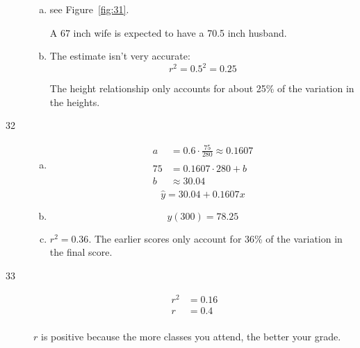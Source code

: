 \documentclass[letterpaper, landscape]{exam}
\begin{document}
\begin{description}
\begin{enumerate}[(a)]
          \item see Figure~\ref{fig:31}.  
          
          A 67 inch wife is expected to have a 70.5 inch husband.

          \item The estimate isn't very accurate:
            \[
              r^2 = 0.5^2 = 0.25
            \]

            The height relationship only accounts for about 25\% of the variation
            in the heights.
            
        \end{enumerate}

      \item[32]
        \begin{enumerate}[(a)]
          \item
            \begin{align*}
              a & = 0.6 \cdot \frac{75}{280} \approx 0.1607 \\
              \\
              75 & = 0.1607 \cdot 280 + b \\
              b  & \approx 30.04 \\
            \end{align*}
            \[
              \boxed{ \hat{y} = 30.04 + 0.1607 x }
            \]

          \item 
            \[
              y(300) = \boxed{ 78.25 }
            \]

          \item
            $r^2 = 0.36$.  The earlier scores only account for 36\% of the
            variation in the final score. 
        \end{enumerate}

      \item[33]
        \begin{align*}
          r^2 & = 0.16 \\
          r   & = \boxed{ 0.4 } \\
        \end{align*}

        $r$ is positive because the more classes you attend, the better your
        grade.


\end{description}
\end{document}
